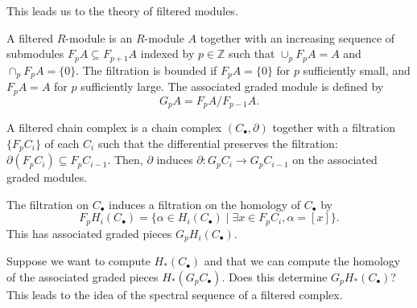 \documentclass[ma3408.tex]{subfiles}
\begin{document}
This leads us to the theory of filtered modules. 
\begin{Def}
	A filtered $R$-module is an $R$-module $A$ together with an increasing sequence of submodules $F_pA \subseteq F_{p+1}A$ indexed by $p \in \mathbb{Z}$ such that $\cup_{p} F_pA = A$ and $\cap_{p} F_pA = \{ 0 \}$. The filtration is bounded if $F_pA = \{ 0 \}$ for $p$ sufficiently small, and $F_pA = A$ for $p$ sufficiently large. The associated graded module is defined by 
	\[
G_pA = F_pA/F_{p-1}A.
	\]
\end{Def}
\begin{Def}
	A filtered chain complex is a chain complex $(C_{\bullet},\partial)$ together with a filtration $\{ F_pC_i \}$ of each $C_i$ such that the differential preserves the filtration: $\partial(F_pC_i) \subseteq F_p C_{i-1}$. Then, $\partial$ induces $\partial \colon G_p C_i \to G_pC_{i-1}$ on the associated graded modules. 
\end{Def}
\begin{Rem}
	The filtration on $C_{\bullet}$ induces a filtration on the homology of $C_{\bullet}$ by
	\[
F_pH_i(C_{\bullet}) = \{ \alpha \in H_i(C_{\bullet}) \mid \exists x \in F_pC_i, \alpha = [x] \}.
	\]
	This has associated graded pieces $G_pH_i(C_{\bullet})$. 
\end{Rem}
\begin{Rem}
Suppose we want to compute $H_*(C_{\bullet})$ and that we can compute the homology of the associated graded pieces $H_*(G_pC_{\bullet})$. Does this determine $G_pH_*(C_{\bullet})$? This leads to the idea of the spectral sequence of a filtered complex. 
\end{Rem}
\end{document}
